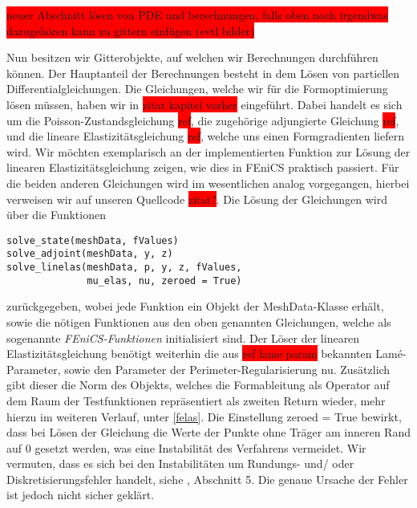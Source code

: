\colorbox{red}{neuer Abschnitt lösen von PDE und berechnungen, falls oben noch irgendwas dazugehören kann zu gittern einfügen (evtl bilder)}

Nun besitzen wir Gitterobjekte, auf welchen wir Berechnungen durchführen können. Der Hauptanteil der Berechnungen besteht in dem Lösen von partiellen Differentialgleichungen. Die Gleichungen, welche wir für die Formoptimierung lösen müssen, haben wir in \colorbox{red}{zitat kapitel vorher} eingeführt. Dabei handelt es sich um die Poisson-Zustandsgleichung \colorbox{red}{ref}, die zugehörige adjungierte Gleichung \colorbox{red}{ref}, und die lineare Elastizitätsgleichung \colorbox{red}{ref}, welche uns einen Formgradienten liefern wird. Wir möchten exemplarisch an der implementierten Funktion zur Lösung der linearen Elastizitätsgleichung zeigen, wie dies in FEniCS praktisch passiert. Für die beiden anderen Gleichungen wird im wesentlichen analog vorgegangen, hierbei verweisen wir auf unseren Quellcode \colorbox{red}{zitat?}. Die Lösung der Gleichungen wird über die Funktionen 
\begin{lstlisting}
solve_state(meshData, fValues)
solve_adjoint(meshData, y, z)
solve_linelas(meshData, p, y, z, fValues, 
	          mu_elas, nu, zeroed = True)
\end{lstlisting}
zurückgegeben, wobei jede Funktion ein Objekt der \textsf{MeshData}-Klasse erhält, sowie die nötigen Funktionen aus den oben genannten Gleichungen, welche als sogenannte \textit{FEniCS-Funktionen} initialisiert sind. Der Löser der linearen Elastizitätsgleichung benötigt weiterhin die aus \colorbox{red}{ref lame param} bekannten Lamé-Parameter, sowie den Parameter der Perimeter-Regularisierung \textsf{nu}. Zusätzlich gibt dieser die Norm des Objekts, welches die Formableitung als Operator auf dem Raum der Testfunktionen repräsentiert als zweiten Return wieder, mehr hierzu im weiteren Verlauf, unter \ref{felas}. Die Einstellung \textsf{zeroed = True} bewirkt, dass bei Lösen der Gleichung die Werte der Punkte ohne Träger am inneren Rand auf 0 gesetzt werden, was eine Instabilität des Verfahrens vermeidet. Wir vermuten, dass es sich bei den Instabilitäten um Rundungs- und/ oder Diskretisierungsfehler handelt, siehe \cite{bfgs1}, Abschnitt 5. Die genaue Ursache der Fehler ist jedoch nicht sicher geklärt. 

